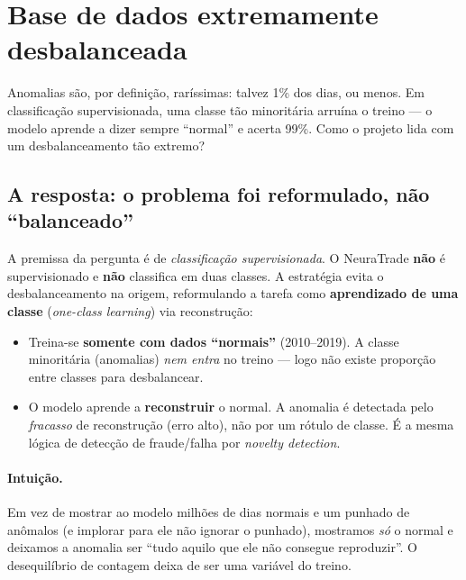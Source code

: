 \section{Base de dados extremamente desbalanceada}
\label{sec:debate-desbal}

\begin{confronto}
Anomalias são, por definição, raríssimas: talvez 1\% dos dias, ou menos. Em
classificação supervisionada, uma classe tão minoritária arruína o treino --- o
modelo aprende a dizer sempre ``normal'' e acerta 99\%. Como o projeto lida com
um desbalanceamento tão extremo?
\end{confronto}

\subsection{A resposta: o problema foi reformulado, não ``balanceado''}
A premissa da pergunta é de \emph{classificação supervisionada}. O NeuraTrade
\textbf{não} é supervisionado e \textbf{não} classifica em duas classes. A
estratégia evita o desbalanceamento na origem, reformulando a tarefa como
\textbf{aprendizado de uma classe} (\emph{one-class learning}) via reconstrução:

\begin{itemize}[noitemsep]
  \item Treina-se \textbf{somente com dados ``normais''} (2010--2019). A classe
        minoritária (anomalias) \emph{nem entra} no treino --- logo não existe
        proporção entre classes para desbalancear.
  \item O modelo aprende a \textbf{reconstruir} o normal. A anomalia é detectada
        pelo \emph{fracasso} de reconstrução (erro alto), não por um rótulo de
        classe. É a mesma lógica de detecção de fraude/falha por
        \emph{novelty detection}.
\end{itemize}

\paragraph{Intuição.} Em vez de mostrar ao modelo milhões de dias normais e um
punhado de anômalos (e implorar para ele não ignorar o punhado), mostramos
\emph{só} o normal e deixamos a anomalia ser ``tudo aquilo que ele não consegue
reproduzir''. O desequilíbrio de contagem deixa de ser uma variável do treino.

